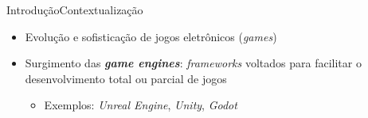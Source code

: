 \begin{frame}{Introdução}{Contextualização}

\begin{itemize}
\item Evolução e sofisticação de jogos eletrônicos (\textit{games})

\item Surgimento das \textbf{\emph{game engines}}: \textit{frameworks} voltados para facilitar o desenvolvimento total ou parcial de jogos

\begin{itemize}
  \item Exemplos: \textit{Unreal Engine}, \textit{Unity}, \textit{Godot}
\end{itemize}


\vspace{0.5cm}


\end{itemize}
\end{frame}
